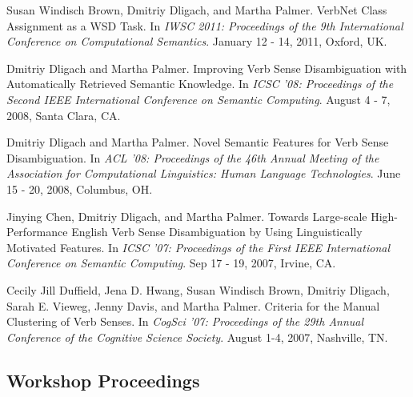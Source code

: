 \documentclass[letterpaper]{article}
\renewenvironment{itemize}{
  \begin{list}{}{
    \setlength{\leftmargin}{1.5em}
  }
}{
  \end{list}
}
\begin{document}
\begin{itemize}
\item Susan Windisch Brown, Dmitriy Dligach, and Martha Palmer. VerbNet Class Assignment as a WSD Task. In \emph {IWSC 2011: Proceedings of the 9th International Conference on Computational Semantics}. January 12 - 14, 2011, Oxford, UK.
\item Dmitriy Dligach and Martha Palmer. Improving Verb Sense Disambiguation with Automatically Retrieved Semantic Knowledge. In \emph {ICSC '08: Proceedings of the Second IEEE International Conference on Semantic Computing}. August 4 - 7, 2008, Santa Clara, CA.
\item Dmitriy Dligach and Martha Palmer. Novel Semantic Features for Verb Sense Disambiguation. In \emph {ACL '08: Proceedings of the 46th Annual Meeting of the Association for Computational Linguistics: Human Language Technologies}. June 15 - 20, 2008, Columbus, OH.
\item Jinying Chen, Dmitriy Dligach, and Martha Palmer. Towards Large-scale High-Performance English Verb Sense Disambiguation by Using Linguistically Motivated Features. In \emph {ICSC '07: Proceedings of the First IEEE International Conference on Semantic Computing}. Sep 17 - 19, 2007, Irvine, CA.
\item Cecily Jill Duffield, Jena D. Hwang, Susan Windisch Brown, Dmitriy Dligach, Sarah E. Vieweg, Jenny Davis, and Martha Palmer. Criteria for the Manual Clustering of Verb Senses. In \emph {CogSci '07: Proceedings of the 29th Annual Conference of the Cognitive Science Society}. August 1-4, 2007, Nashville, TN.
\end{itemize}

\subsection*{Workshop Proceedings}
\end{document}

